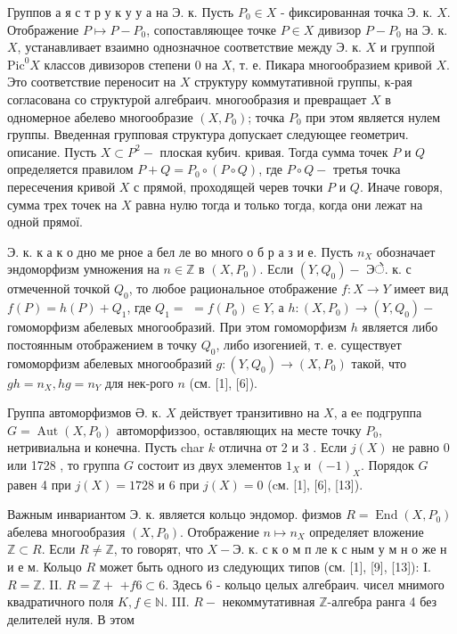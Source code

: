 \documentclass[10pt]{article}
\begin{document}
Группов а я с т р у к у у а на Э. к. Пусть $P_{0} \in X$ - фиксированная точка Э. к. $X$. Отображение $P \longmapsto P-P_{0}$, сопоставляющее точке $P \in X$ дивизор $P-P_{0}$ на Э. к. $X$, устанавливает взаимно однозначное соответствие между Э. к. $X$ и группой $\mathrm{Pic}^{0} X$ классов дивизоров степени 0 на $X$, т. е. Пикара многообразием кривой $X$. Это соответствие переносит на $X$ структуру коммутативноӥ группы, к-рая согласована со структурой алгебраич. многообразия и превращает $X$ в одномерное абелево многообразие $\left(X, P_{0}\right)$; точка $P_{0}$ при этом является нулем группы. Введенная групповая структура допускает следующее геометрич. описание. Пусть $X \subset P^{2}-$ плоская кубич. кривая. Тогда сумма точек $P$ и $Q$ определяется правилом $P+Q=P_{0} \circ(P \circ Q)$, где $P \circ Q-$ третья точка пересечения кривой $X$ с прямой, проходящей черев точки $P$ и $Q$. Иначе говоря, сумма трех точек на $X$ равна нулю тогда и только тогда, когда они лежат на одной прямої.



Э. к. к а к о дно ме рное а бел ле во много о б р а з и е. Пусть $n_{X}$ обозначает эндоморфизм умножения на $n \in \mathbb{Z}$ в $\left(X, P_{0}\right)$. Если $\left(Y, Q_{0}\right)-$ Эे. к. с отмеченной точкой $Q_{0}$, то любое рациональное отображение $f: X \rightarrow Y$ имеет вид $f(P)=h(P)+Q_{1}$, где $Q_{1}=$ $=f\left(P_{0}\right) \in Y$, а $h:\left(X, P_{0}\right) \rightarrow\left(Y, Q_{0}\right)-$ гомоморфизм абелевых многообразий. При этом гомоморфизм $h$ является либо постоянным отображением в точку $Q_{0}$, либо изогенией, т. е. существует гомоморфизм абелевых многообразий $g:\left(Y, Q_{0}\right) \rightarrow\left(X, P_{0}\right)$ такой, что $g h=n_{X}, h g=n_{Y}$ для нек-рого $n$ (см. [1], [6]).



Группа автоморфизмов Ә. к. $X$ действует транзитивно на $X$, а еe подгруппа $G=\operatorname{Aut}\left(X, P_{0}\right)$ автоморфиззоо, оставляющих на месте точку $P_{0}$, нетривиальна и конечна. Пусть char $k$ отлична от 2 и 3 . Если $j(X)$ не равно 0 или 1728 , то группа $G$ состоит из двух элементов $1_{X}$ и $(-1)_{X}$. Порядок $G$ равен 4 при $j(X)=1728$ и 6 при $j(X)=0$ (cм. [1], [6], [13]).



Важным инвариантом Э. к. является кольцо эндомор. физмов $R=\operatorname{End}\left(X, P_{0}\right)$ абелева многообразия $\left(X, P_{0}\right)$. Отображение $n \longmapsto n_{X}$ определяет вложение $\mathbb{Z} \subset R$. Если $R \neq \mathbb{Z}$, то говорят, что $X-Э$. к. с к о м п ле к с ным у м н о же н и е м. Кольцо $R$ может быть одного из следующих типов (см. [1], [9], [13]): I. $R=\mathbb{Z}$. II. $R=\mathbb{Z}+$ $+f 6 \subset 6$. Здесь 6 - кольцо целых алгебраич. чисел мнимого квадратичного поля $K, f \in \mathbb{N}$. III. $R-$ некоммутативная $\mathbb{Z}$-алгебра ранга 4 без делителей нуля. В этом
\end{document}
